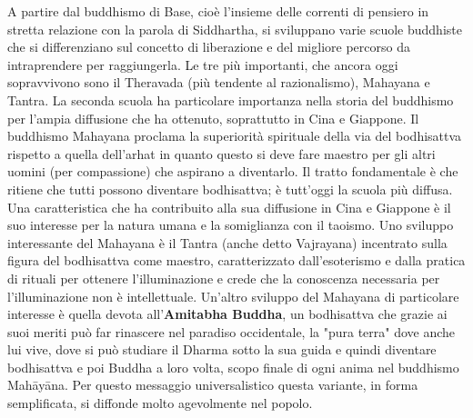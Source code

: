 \documentclass[10pt,a4paper]{report}
\begin{document}
A partire dal  buddhismo di Base, cioè l'insieme delle correnti di pensiero in stretta relazione con la parola di Siddhartha, si sviluppano varie scuole buddhiste che si differenziano sul concetto di liberazione e del migliore percorso da intraprendere per raggiungerla. Le tre più importanti, che ancora oggi sopravvivono sono il Theravada (più tendente al razionalismo), Mahayana e Tantra. La seconda scuola ha particolare importanza nella storia del buddhismo per l'ampia diffusione che ha ottenuto, soprattutto in Cina e Giappone. Il buddhismo Mahayana proclama la superiorità spirituale della via del bodhisattva rispetto a quella dell'arhat in quanto questo si deve fare maestro per gli altri uomini (per compassione) che aspirano a diventarlo. Il tratto fondamentale è che ritiene che tutti possono diventare bodhisattva; è tutt'oggi la scuola più diffusa. Una caratteristica che ha contribuito alla sua diffusione in Cina e Giappone è il suo interesse per la natura umana e la somiglianza con il taoismo. Uno sviluppo interessante del Mahayana è il Tantra (anche detto Vajrayana) incentrato sulla figura del bodhisattva come maestro, caratterizzato dall'esoterismo e dalla pratica di rituali per ottenere l'illuminazione e crede che la conoscenza necessaria per l'illuminazione non è intellettuale. Un'altro sviluppo del Mahayana di particolare interesse è quella devota all'\textbf{Amitabha Buddha}, un bodhisattva che grazie ai suoi meriti può far rinascere nel paradiso occidentale, la "pura terra" dove anche lui vive, dove si può studiare il Dharma sotto la sua guida e quindi diventare bodhisattva e poi Buddha a loro volta, scopo finale di ogni anima nel buddhismo Mahāyāna. Per questo messaggio universalistico questa variante, in forma semplificata, si diffonde molto agevolmente nel popolo.
\end{document}

